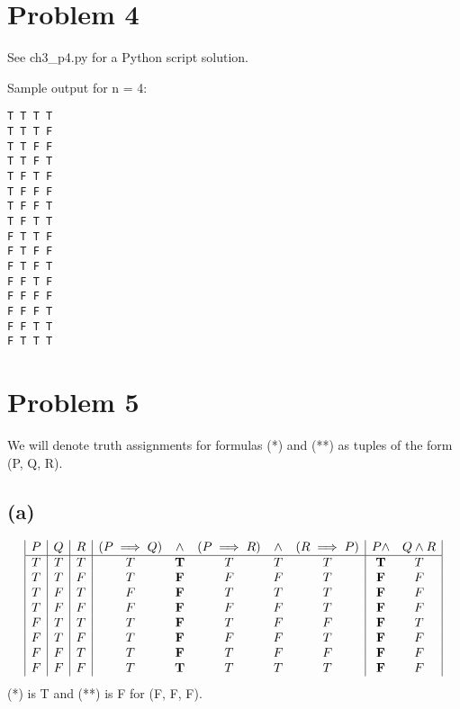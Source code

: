 \documentclass{article}
\begin{document}
\pagebreak

\section{Problem 4}
See ch3\_p4.py for a Python script solution.

Sample output for n = 4:

\begin{verbatim}
T T T T
T T T F
T T F F
T T F T
T F T F
T F F F
T F F T
T F T T
F T T F
F T F F
F T F T
F F T F
F F F F
F F F T
F F T T
F T T T
\end{verbatim}


\pagebreak

\section{Problem 5}

We will denote truth assignments for formulas (*) and (**) as tuples of the form (P, Q, R).

\subsection{(a)}
\[
	\begin{array}{|c|c|c|c c c c c|c c|}
		P & Q & R & (P \implies Q) & \land      & (P \implies R) & \land & (R \implies P) & P \land    & Q \land R \\
		\hline
		T & T & T & T              & \mathbf{T} & T              & T     & T              & \mathbf{T} & T         \\
		T & T & F & T              & \mathbf{F} & F              & F     & T              & \mathbf{F} & F         \\
		T & F & T & F              & \mathbf{F} & T              & T     & T              & \mathbf{F} & F         \\
		T & F & F & F              & \mathbf{F} & F              & F     & T              & \mathbf{F} & F         \\
		F & T & T & T              & \mathbf{F} & T              & F     & F              & \mathbf{F} & T         \\
		F & T & F & T              & \mathbf{F} & F              & F     & T              & \mathbf{F} & F         \\
		F & F & T & T              & \mathbf{F} & T              & F     & F              & \mathbf{F} & F         \\
		F & F & F & T              & \mathbf{T} & T              & T     & T              & \mathbf{F} & F         \\
	\end{array}
\]
(*) is T and (**) is F for (F, F, F).
\end{document}
